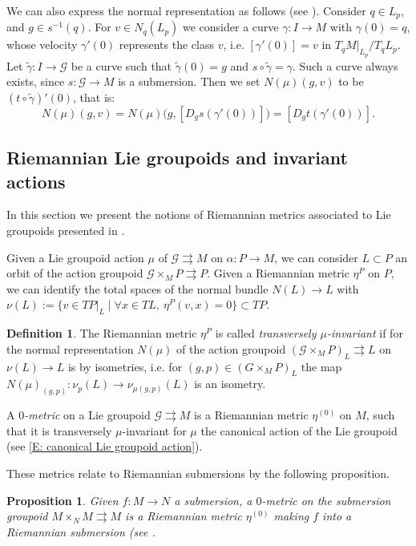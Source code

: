 \documentclass[12pt,a4paper,reqno]{amsart}
\newcommand{\1}{\mathbbm{1}} %
\newcommand{\G}{\mathcal{G}} %
\newtheorem{proposition}[thm]{Proposition}
\theoremstyle{definition}
\newtheorem{definition}[thm]{Definition}
\theoremstyle{TheoremNum}
\begin{document}
We can also express the normal representation as follows (see \cite[p.~178]{delHoyo2013}). Consider $q\in L_p$, and $g\in s^{-1}(q)$. For $v\in N_q(L_p)$ we consider a curve $\gamma\colon I \to M$ with $\gamma(0) = q$, whose velocity $\gamma'(0)$ represents the class  $v$, i.e. $[\gamma'(0)] = v$ in $T_q M|_{L_p}/T_q L_p$. Let $\widetilde{\gamma}\colon I \to \G$ be a curve such that $\widetilde{\gamma}(0) = g$ and $s\circ \widetilde{\gamma} = \gamma$. Such a curve always exists, since $s\colon \G\to M$ is a submersion. Then we set $N(\mu)(g,v)$ to be $(t\circ \widetilde{\gamma})'(0)$, that is:
\[
N(\mu)(g,v) = N(\mu)\big(g,[D_g s(\gamma'(0))] \big) = [D_g t(\gamma'(0))].
\]


\subsection{Riemannian Lie groupoids and invariant actions}\label{S: Riemannian Lie groupoids} In this section we present the notions of Riemannian metrics associated to Lie groupoids presented in \cite{delHoyoFernandes2018}.

Given a Lie groupoid action $\mu$ of $\G\rightrightarrows M$ on $\alpha\colon P\to M$, we can consider $L\subset P$ an orbit of the action groupoid $\G\times_M P\rightrightarrows P$. Given a Riemannian metric $\eta^P$ on $P$, we can identify the total spaces of the  normal bundle $N(L)\to L$ with $\nu(L):= \{v\in TP|_{L}\mid\forall x\in TL,\: \eta^{P}(v,x) =0\}\subset TP$. 

\begin{definition}\th\label{D: mu-transversly invariant}
The Riemannian metric $\eta^P$ is called \emph{transversely $\mu$-invariant} if for the  normal representation $N(\mu)$ of the action groupoid $(\G\times_M P)_L \rightrightarrows L$ on $\nu(L)\to L$  is by isometries, i.e. for $(g,p)\in (G\times_M P)_L$ the map $N(\mu)_{(g,p)}\colon \nu_{p}(L) \to \nu_{\mu(g,p)}(L)$ is an isometry.
\end{definition}

A \emph{$0$-metric} on a Lie groupoid $\G\rightrightarrows M$ is a Riemannian metric $\eta^{(0)}$ on $M$, such that it is transversely $\mu$-invariant for $\mu$ the canonical action of the Lie groupoid (see \th\ref{E: canonical Lie groupoid action}). 

These metrics relate to Riemannian submersions by the following proposition.

\begin{proposition}
Given $f\colon M\to N$ a submersion, a $0$-metric on the submersion groupoid $M\times_N M\rightrightarrows M$ is a Riemannian metric $\eta^{(0)}$ making $f$ into a Riemannian submersion (see \cite[Example 3.4]{delHoyoFernandes2018}.
\end{proposition}
\end{document}
